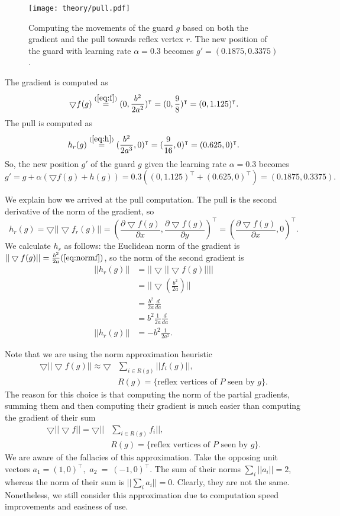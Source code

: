 \begin{figure*}[!h]
    \texttt{[image: theory/pull.pdf]}
    \centering
    \caption{Computing the movements of the guard $g$ based on both the gradient and the pull towards reflex vertex $r$. The new position of the guard with learning rate $\alpha = 0.3$ becomes $g' = (0.1875, 0.3375)$.}
    \label{fig:pull}
\end{figure*}

The gradient is computed as
$$\bigtriangledown f(g) \overset{(\ref{eq:f})}{=} (0, \frac{b^2}{2a^2})^\intercal = (0, \frac{9}{8})^\intercal = (0, 1.125)^\intercal.$$ 
The pull is computed as 
$$h_r(g) \overset{(\ref{eq:h})}{=} (\frac{b^2}{2a^3}, 0)^\intercal = (\frac{9}{16}, 0)^\intercal = (0.625, 0)^\intercal.$$
So, the new position $g'$ of the guard $g$ given the learning rate $\alpha = 0.3$ becomes 
$$g' = g + \alpha(\bigtriangledown f(g) + h(g)) = 0.3 ((0, 1.125)^\intercal + (0.625, 0)^\intercal) = (0.1875, 0.3375).$$

We explain how we arrived at the pull computation. The pull is the second derivative of the norm of the gradient, so 
$$h_r(g) = \bigtriangledown ||\bigtriangledown f_r(g)|| = \left(\frac{\partial \bigtriangledown f(g)}{\partial x}, \frac{\partial \bigtriangledown f(g)}{\partial y}\right)^\intercal = \left(\frac{\partial \bigtriangledown f(g)}{\partial x}, 0\right)^\intercal.$$  
We calculate $h_r$ as follows: the Euclidean norm of the gradient is $||\bigtriangledown f(g)|| = \frac{b^2}{2a} (\ref{eq:normf})$, so the norm of the second gradient is 
\begin{align*}
||h_r(g)||&= ||\bigtriangledown ||\bigtriangledown f(g)|||| \\
       &= ||\bigtriangledown (\frac{b^2}{2a})|| \\
       &= \frac{b^2}{2a}\frac{d}{da} \\
       &= b^2\frac{1}{2a}\frac{d}{da} \\
||h_r(g)||&= -b^2\frac{1}{2a^2}.
\end{align*}

Note that we are using the norm approximation heuristic 
\begin{align*}
    \bigtriangledown ||\bigtriangledown f(g)|| \approx \bigtriangledown &\sum_{i \in R(g)} ||f_i(g)||, \\
    &R(g) = \{\text{reflex vertices of } P \text{ seen by } g\}. 
\end{align*}
The reason for this choice is that computing the norm of the partial gradients, summing them and then computing their gradient is much easier than computing the gradient of their sum 
\begin{align*}
    \bigtriangledown ||\bigtriangledown f|| = \bigtriangledown ||&\sum_{i \in R(g)} f_i||, \\
    &R(g) = \{\text{reflex vertices of } P \text{ seen by } g\}.
\end{align*}
We are aware of the fallacies of this approximation. Take the opposing unit vectors $a_1 = (1, 0)^\intercal,$ $a_2~=~(-1, 0)^\intercal$. The sum of their norms $\sum_i ||a_i|| = 2$, whereas the norm of their sum is $||\sum_i a_i|| = 0$. Clearly, they are not the same. Nonetheless, we still consider this approximation due to computation speed improvements and easiness of use.

